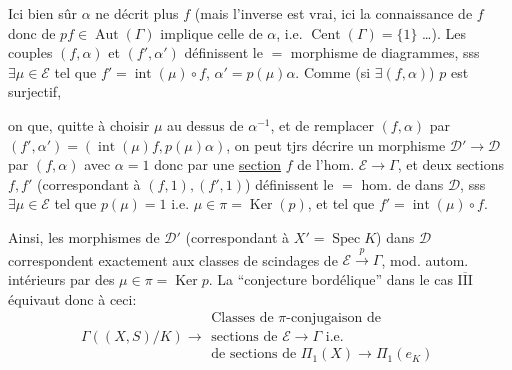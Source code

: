 Ici bien sûr $\alpha$ ne décrit plus $f$ (mais l'inverse est  vrai, ici la connaissance de $f$ donc de $pf\in\operatorname{Aut}(\Gamma)$ implique celle de $\alpha$, i.e. $\operatorname{Cent}(\Gamma)=\{1\}$ \ldots).
Les couples $(f,\alpha)$ et $(f',\alpha')$ définissent le $=$ morphisme de diagrammes, sss $\exists\mu\in\mathcal E$ tel que $f'=\operatorname{int}(\mu)\circ f$, $\alpha'=p(\mu)\alpha$.
Comme (si $\exists(f,\alpha)$) $p$ est surjectif,



on  que, quitte à choisir $\mu$ au dessus de  $\alpha^{-1}$, et de remplacer $(f,\alpha)$ par $(f',\alpha')=(\operatorname{int}(\mu)f,p(\mu)\alpha)$, on peut tjrs décrire un morphisme $\mathcal D'\to\mathcal D$ par $(f,\alpha)$ avec $\alpha=1$ donc par une \uline{section} $f$ de l'hom. $\mathcal E\to\Gamma$, et deux sections $f,f'$ (correspondant à $(f,1),(f',1)$) définissent le $=$ hom. de  dans $\mathcal D$, sss $\exists\mu\in\mathcal E$ tel que $p(\mu)=1$ i.e. $\mu\in\pi=\operatorname{Ker}(p)$, et tel que $f'=\operatorname{int}(\mu)\circ f$.

Ainsi, les morphismes de $\mathcal D'$ (correspondant à $X'=\operatorname{Spec}K$) dans $\mathcal D$ correspondent exactement aux classes de scindages de $\mathcal E\xrightarrow{p}\Gamma$, mod. autom. intérieurs par des $\mu\in\pi=\operatorname{Ker}p$. La ``conjecture bordélique'' dans le cas \uline{$\overline{\mathrm{III}}$} équivaut donc à ceci:
\[
 \Gamma((X,S)/K)\longrightarrow
 \begin{gathered}
 \text{Classes de $\pi$-conjugaison de}\\
 \text{sections de }\mathcal E\to\Gamma\text{ i.e.}\\
 \text{de sections de }\Pi_1(X)\to\Pi_1(e_K)
 \end{gathered}
\]

